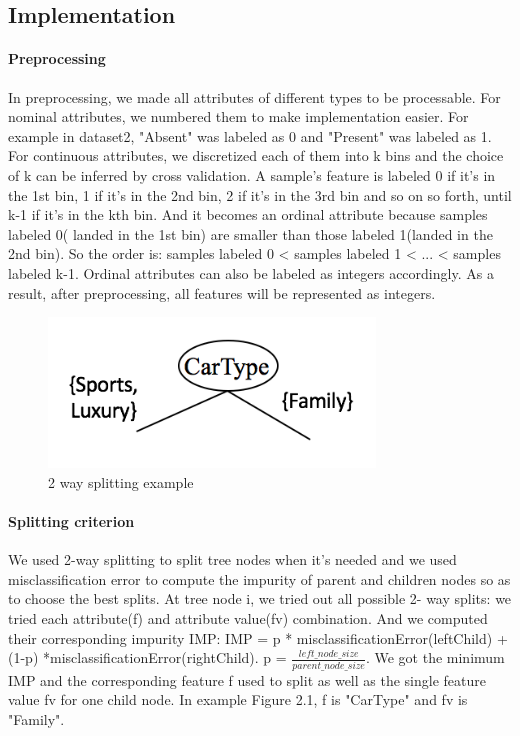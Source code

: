 \documentclass[paper=letter, fontsize=11pt]{article}
\numberwithin{equation}{section}		%
\numberwithin{figure}{section}			%
\numberwithin{table}{section}				%
\begin{document}
\subsection{Implementation}
\paragraph{Preprocessing}In preprocessing, we made all attributes of different types to be
processable. For nominal attributes, we numbered them to make implementation easier. For example in dataset2, "Absent" was labeled as 0 and "Present" was labeled as 1. For continuous attributes, we discretized each of them into k bins and the
choice of k can be inferred by cross validation. A sample's feature is labeled 0 if
it's in the 1st bin, 1 if it's in the 2nd bin, 2 if it's in the 3rd bin and so on so forth,
until k-1 if it's in the kth bin. And it becomes an ordinal attribute because samples
labeled 0( landed in the 1st bin) are smaller than those labeled 1(landed in the 2nd
bin). So the order is: samples labeled 0 < samples labeled 1 < ... < samples labeled
k-1. Ordinal attributes can also be labeled as integers accordingly. As a result, after
preprocessing, all features will be represented as integers.

\begin{figure}[t]
  \centering
  \includegraphics[width=0.8\linewidth,height=4cm]{f_fv.png}
  \caption{2 way splitting example}
\end{figure}

\paragraph{Splitting criterion} We used 2-way splitting to split tree nodes when it's needed
and we used misclassification error to compute the impurity of parent and children
nodes so as to choose the best splits. At tree node i, we tried out all possible 2-
way splits: we tried each attribute(f) and attribute value(fv) combination. And we
computed their corresponding impurity IMP: IMP = p * misclassificationError(leftChild) + (1-p) *misclassificationError(rightChild). p = $\frac{left{\_}node{\_}size}{parent{\_}node{\_}size}$. We got the minimum IMP and the corresponding feature f used to split as well as the
single feature value fv for one child node. In example Figure 2.1,  f is "CarType" and fv is "Family".
\end{document}
